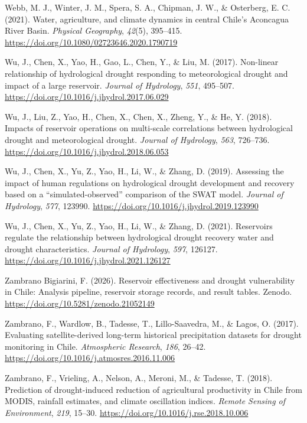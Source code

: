 \documentclass[
]{agujournal2019}
\newlength{\cslhangindent}
\newenvironment{CSLReferences}[2] %
 {\begin{list}{}{%
  \setlength{\itemindent}{0pt}
  \setlength{\leftmargin}{0pt}
  \setlength{\parsep}{0pt}
  \ifodd #1
   \setlength{\leftmargin}{\cslhangindent}
   \setlength{\itemindent}{-1\cslhangindent}
  \fi
  \setlength{\itemsep}{#2\baselineskip}}}
 {\end{list}}
\begin{document}
\begin{CSLReferences}{1}{0}
Webb, M. J., Winter, J. M., Spera, S. A., Chipman, J. W., \& Osterberg,
E. C. (2021). Water, agriculture, and climate dynamics in central
{Chile}'s {Aconcagua} {River} {Basin}. \emph{Physical Geography},
\emph{42}(5), 395--415.
\url{https://doi.org/10.1080/02723646.2020.1790719}

Wu, J., Chen, X., Yao, H., Gao, L., Chen, Y., \& Liu, M. (2017).
Non-linear relationship of hydrological drought responding to
meteorological drought and impact of a large reservoir. \emph{Journal of
Hydrology}, \emph{551}, 495--507.
\url{https://doi.org/10.1016/j.jhydrol.2017.06.029}

Wu, J., Liu, Z., Yao, H., Chen, X., Chen, X., Zheng, Y., \& He, Y.
(2018). Impacts of reservoir operations on multi-scale correlations
between hydrological drought and meteorological drought. \emph{Journal
of Hydrology}, \emph{563}, 726--736.
\url{https://doi.org/10.1016/j.jhydrol.2018.06.053}

Wu, J., Chen, X., Yu, Z., Yao, H., Li, W., \& Zhang, D. (2019).
Assessing the impact of human regulations on hydrological drought
development and recovery based on a {``simulated-observed''} comparison
of the {SWAT} model. \emph{Journal of Hydrology}, \emph{577}, 123990.
\url{https://doi.org/10.1016/j.jhydrol.2019.123990}

Wu, J., Chen, X., Yu, Z., Yao, H., Li, W., \& Zhang, D. (2021).
Reservoirs regulate the relationship between hydrological drought
recovery water and drought characteristics. \emph{Journal of Hydrology},
\emph{597}, 126127. \url{https://doi.org/10.1016/j.jhydrol.2021.126127}

Zambrano Bigiarini, F. (2026). Reservoir effectiveness and drought
vulnerability in {Chile}: Analysis pipeline, reservoir storage records,
and result tables. Zenodo. \url{https://doi.org/10.5281/zenodo.21052149}

Zambrano, F., Wardlow, B., Tadesse, T., Lillo-Saavedra, M., \& Lagos, O.
(2017). Evaluating satellite-derived long-term historical precipitation
datasets for drought monitoring in {Chile}. \emph{Atmospheric Research},
\emph{186}, 26--42. \url{https://doi.org/10.1016/j.atmosres.2016.11.006}

Zambrano, F., Vrieling, A., Nelson, A., Meroni, M., \& Tadesse, T.
(2018). Prediction of drought-induced reduction of agricultural
productivity in {Chile} from {MODIS}, rainfall estimates, and climate
oscillation indices. \emph{Remote Sensing of Environment}, \emph{219},
15--30. \url{https://doi.org/10.1016/j.rse.2018.10.006}


\end{CSLReferences}
\end{document}
